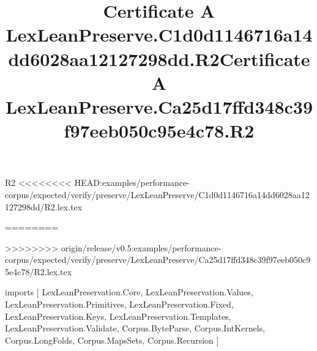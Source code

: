 \begin{lexlean}{R2}
<<<<<<<< HEAD:examples/performance-corpus/expected/verify/preserve/LexLeanPreserve/C1d0d1146716a14dd6028aa12127298dd/R2.lex.tex
\title{Certificate A LexLeanPreserve.C1d0d1146716a14dd6028aa12127298dd.R2}
========
\title{Certificate A LexLeanPreserve.Ca25d17ffd348c39f97eeb050c95e4c78.R2}
>>>>>>>> origin/release/v0.5:examples/performance-corpus/expected/verify/preserve/LexLeanPreserve/Ca25d17ffd348c39f97eeb050c95e4c78/R2.lex.tex
\begin{coremodule}
imports [
  LexLeanPreservation.Core,
  LexLeanPreservation.Values,
  LexLeanPreservation.Primitives,
  LexLeanPreservation.Fixed,
  LexLeanPreservation.Keys,
  LexLeanPreservation.Templates,
  LexLeanPreservation.Validate,
  Corpus.ByteParse,
  Corpus.IntKernels,
  Corpus.LongFolds,
  Corpus.MapsSets,
  Corpus.Recursion
]


\end{coremodule}
\end{lexlean}
